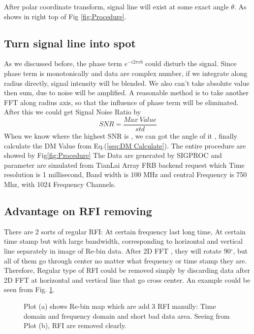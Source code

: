 \documentclass[twocolumn]{aastex61}
\begin{document}
 After polar coordinate transform, signal line will exist at some exact angle $\theta$. As shows in right top of Fig \ref{fig:Procedure}. 

\subsection{Turn signal line into spot}
As we discussed before, the phase term $e^{-i2\pi vb}$ could disturb the signal. Since phase term is monotonically and data are complex number, if we integrate along radius directly, signal intensity will be blended. We also can't take absolute value then sum,  due to noise will be amplified. A reasonable method is to take another FFT along radius axis, so that the influence of phase term will be eliminated.
After this we could get Signal Noise Ratio by 
\begin{equation*}
SNR = \frac{Max~Value}{std}
\end{equation*}
When we know where the highest SNR is , we can got the angle of it , finally calculate the DM Value from Eq.(\ref{seq:DM Calculate}). 
The entire procedure are showed by Fig\ref{fig:Procedure} The Data are generated by SIGPROC and parameter are simulated from TianLai Array FRB backend request which Time resolution is 1 millisecond, Band width is 100 MHz and central Frequency is 750 Mhz,  with 1024 Frequency Channels.


\subsection{Advantage on RFI removing}
There are 2 sorts of regular RFI: At certain frequency last long time, At certain time stamp but with large bandwidth, corresponding to horizontal and vertical line separately in image of Re-bin data. After 2D FFT , they will rotate 90$^{\circ}$, but all of them go through center no matter what frequency or time stamp they are. Therefore, Regular type of RFI could be removed simply by discarding data after 2D FFT at horizontal and vertical line that go cross center.%
An example could be seen from Fig. \ref{fig:RFI remove}.

\begin{figure}[ht!]
\centering
{}
\caption{Plot (a) shows Re-bin map which are add 3 RFI manully: Time domain and frequency domain and short bad data area. Seeing from Plot (b), RFI are removed clearly.  \label{fig:RFI remove}}
\end{figure}
\end{document}
